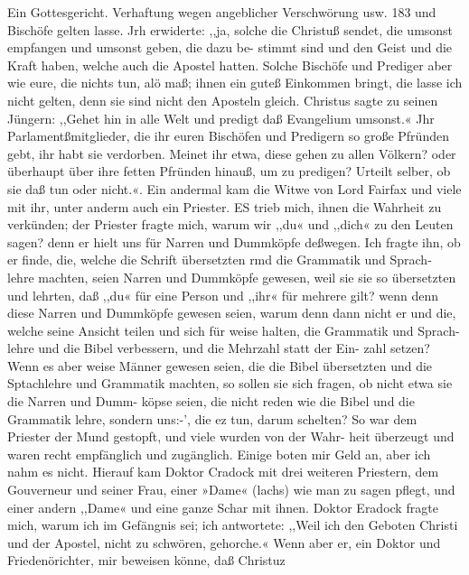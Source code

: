 Ein Gottesgericht. Verhaftung wegen angeblicher Verschwörung usw. 183
und Bischöfe gelten lasse. Jrh erwiderte: ,,ja, solche die Christuß
sendet, die umsonst empfangen und umsonst geben, die dazu be-
stimmt sind und den Geist und die Kraft haben, welche auch die
Apostel hatten. Solche Bischöfe und Prediger aber wie eure, die
nichts tun, alö maß; ihnen ein guteß Einkommen bringt, die
lasse ich nicht gelten, denn sie sind nicht den Aposteln gleich.
Christus sagte zu seinen Jüngern: ,,Gehet hin in alle Welt und
predigt daß Evangelium umsonst.« Jhr Parlamentßmitglieder,
die ihr euren Bischöfen und Predigern so große Pfründen gebt,
ihr habt sie verdorben. Meinet ihr etwa, diese gehen zu allen
Völkern? oder überhaupt über ihre fetten Pfründen hinauß, um
zu predigen? Urteilt selber, ob sie daß tun oder nicht.«.
Ein andermal kam die Witwe von Lord Fairfax und viele
mit ihr, unter anderm auch ein Priester. ES trieb mich, ihnen
die Wahrheit zu verkünden; der Priester fragte mich, warum wir
,,du« und ,,dich« zu den Leuten sagen? denn er hielt uns für
Narren und Dummköpfe deßwegen. Ich fragte ihn, ob er finde,
die, welche die Schrift übersetzten rmd die Grammatik und Sprach-
lehre machten, seien Narren und Dummköpfe gewesen, weil sie
sie so übersetzten und lehrten, daß ,,du« für eine Person und
,,ihr« für mehrere gilt? wenn denn diese Narren und Dummköpfe
gewesen seien, warum denn dann nicht er und die, welche seine
Ansicht teilen und sich für weise halten, die Grammatik und Sprach-
lehre und die Bibel verbessern, und die Mehrzahl statt der Ein-
zahl setzen? Wenn es aber weise Männer gewesen seien, die die
Bibel übersetzten und die Sptachlehre und Grammatik machten,
so sollen sie sich fragen, ob nicht etwa sie die Narren und Dumm-
köpse seien, die nicht reden wie die Bibel und die Grammatik
lehre, sondern uns:-’, die ez tun, darum schelten? So war dem
Priester der Mund gestopft, und viele wurden von der Wahr-
heit überzeugt und waren recht empfänglich und zugänglich. Einige
boten mir Geld an, aber ich nahm es nicht.
Hierauf kam Doktor Cradock mit drei weiteren Priestern,
dem Gouverneur und seiner Frau, einer »Dame« (lachs) wie
man zu sagen pflegt, und einer andern ,,Dame« und eine ganze
Schar mit ihnen. Doktor Eradock fragte mich, warum ich im
Gefängnis sei; ich antwortete: ,,Weil ich den Geboten Christi und
der Apostel, nicht zu schwören, gehorche.« Wenn aber er, ein
Doktor und Friedenörichter, mir beweisen könne, daß Christuz


